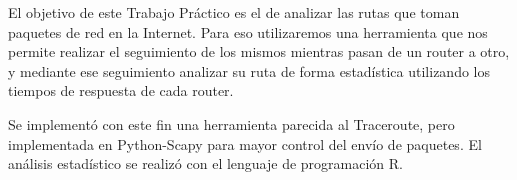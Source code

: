 El objetivo de este Trabajo Práctico es el de analizar las rutas que toman paquetes de red
en la Internet. Para eso utilizaremos una herramienta que nos 
permite realizar el seguimiento de los mismos mientras pasan de un router a otro,
y mediante ese seguimiento analizar su ruta
de forma estadística utilizando los tiempos de respuesta de cada router.

Se implementó con este fin una herramienta parecida al Traceroute,
pero implementada en Python-Scapy para mayor control del envío de 
paquetes. El análisis estadístico se realizó con el lenguaje de programación R.
